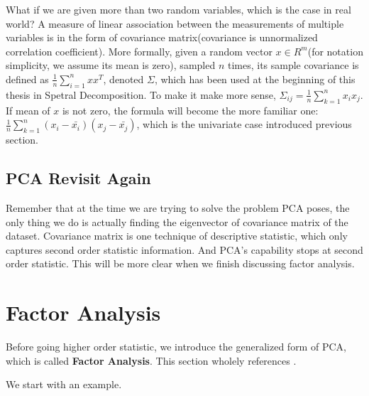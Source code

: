 \documentclass[a4paper]{book}
\begin{document}
    What if we are given more than two random variables, which is the
    case in real world? A measure of linear association between the
    measurements of multiple variables is in the form of covariance
    matrix(covariance is unnormalized correlation coefficient). More
    formally, given a random vector $x \in R^{m}$(for notation
    simplicity, we assume its mean is zero), sampled $n$ times, its
    sample covariance is defined as
    $\frac{1}{n}\sum\limits^{n}_{i=1}xx^{T}$, denoted $\Sigma$, which
    has been used at the beginning of this thesis in Spetral
    Decomposition. To make it make more sense, $\Sigma_{ij} =
    \frac{1}{n}\sum\limits^{n}_{k=1}x_{i}x_{j}$. If mean of $x$ is not
    zero, the formula will become the more familiar one:
    $\frac{1}{n}\sum\limits^{n}_{k=1}(x_{i} - \bar{x_{i}})(x_{j} -
      \bar{x_{j}})$, which is the univariate case introduced previous
      section.

    \subsection{PCA Revisit Again}
    Remember that at the time we are trying to solve the problem PCA
    poses, the only thing we do is actually finding the eigenvector of
    covariance matrix of the dataset. Covariance matrix is one technique
    of descriptive statistic, which only captures second order statistic
    information. And PCA's capability stops at second order statistic.
    This will be more clear when we finish discussing factor analysis.

  \section{Factor Analysis}
  Before going higher order statistic, we introduce the generalized form
  of PCA, which is called \textbf{Factor Analysis}. This section wholely
  references \cite{johnson2007applied}.

  We start with an example.
\end{document}
